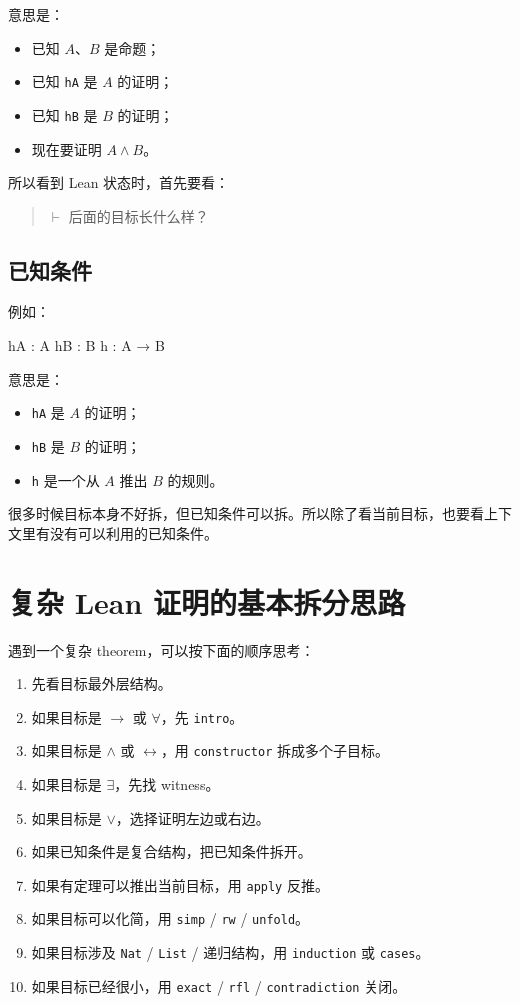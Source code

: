 \documentclass[UTF8,12pt]{ctexart}
\begin{document}
意思是：
\begin{itemize}
  \item 已知 \(A\)、\(B\) 是命题；
  \item 已知 \texttt{hA} 是 \(A\) 的证明；
  \item 已知 \texttt{hB} 是 \(B\) 的证明；
  \item 现在要证明 \(A \land B\)。
\end{itemize}

所以看到 Lean 状态时，首先要看：

\begin{quote}
\(\vdash\) 后面的目标长什么样？
\end{quote}

\subsection{已知条件}

例如：

\begin{LeanCode}
hA : A
hB : B
h : A → B
\end{LeanCode}

意思是：
\begin{itemize}
  \item \texttt{hA} 是 \(A\) 的证明；
  \item \texttt{hB} 是 \(B\) 的证明；
  \item \texttt{h} 是一个从 \(A\) 推出 \(B\) 的规则。
\end{itemize}

很多时候目标本身不好拆，但已知条件可以拆。所以除了看当前目标，也要看上下文里有没有可以利用的已知条件。

\section{复杂 Lean 证明的基本拆分思路}

遇到一个复杂 theorem，可以按下面的顺序思考：

\begin{enumerate}
  \item 先看目标最外层结构。
  \item 如果目标是 \(\to\) 或 \(\forall\)，先 \texttt{intro}。
  \item 如果目标是 \(\land\) 或 \(\leftrightarrow\)，用 \texttt{constructor} 拆成多个子目标。
  \item 如果目标是 \(\exists\)，先找 witness。
  \item 如果目标是 \(\lor\)，选择证明左边或右边。
  \item 如果已知条件是复合结构，把已知条件拆开。
  \item 如果有定理可以推出当前目标，用 \texttt{apply} 反推。
  \item 如果目标可以化简，用 \texttt{simp} / \texttt{rw} / \texttt{unfold}。
  \item 如果目标涉及 \texttt{Nat} / \texttt{List} / 递归结构，用 \texttt{induction} 或 \texttt{cases}。
  \item 如果目标已经很小，用 \texttt{exact} / \texttt{rfl} / \texttt{contradiction} 关闭。
\end{enumerate}
\end{document}
